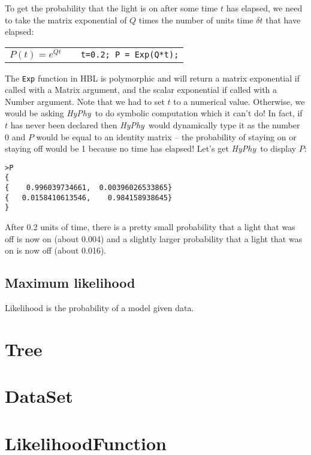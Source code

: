 \documentclass[12pt,twoside,openright]{book}
\newcommand{\hyphy}{\textit{HyPhy}}
\begin{document}
To get the probability that the light is on after some time $t$ has elapsed, we need to take the matrix exponential of $Q$ times the number of units time $\delta t$ that have elapsed:

\begin{center}
\begin{tabular}{ccc}
$P(t) = e^{Q t}$
& 
\hspace{1in}
&
{\tt t=0.2; P = Exp(Q*t);}\\
\end{tabular}
\end{center}

\noindent  The {\tt Exp} function in HBL is polymorphic and will return a matrix exponential if called with a Matrix argument, and the scalar exponential if called with a Number argument.  Note that we had to set $t$ to a numerical value.  Otherwise, we would be asking \hyphy\ to do symbolic computation which it can't do!  In fact, if $t$ has never been declared then \hyphy\ would dynamically type it as the number 0 and $P$ would be equal to an identity matrix -- the probability of staying on or staying off would be 1 because no time has elapsed!  Let's get \hyphy\ to display $P$:

\begin{leftbar}
\begin{verbatim}
>P
{
{    0.996039734661,  0.00396026533865}
{   0.0158410613546,    0.984158938645}
}
\end{verbatim}
\end{leftbar}

\noindent After 0.2 units of time, there is a pretty small probability that a light that was off is now on (about 0.004) and a slightly larger probability that a light that was on is now off (about 0.016).  


\section {Maximum likelihood}

Likelihood is the probability of a model given data.  

\chapter {Tree}



\chapter {DataSet}

\chapter {LikelihoodFunction}
\end{document}
